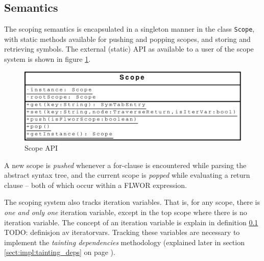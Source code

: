 \subsection{Semantics}
The scoping semantics is encapsulated in a singleton manner in the class
\texttt{Scope}, with static methods available for pushing and popping scopes,
and storing and retrieving symbols. The external (static) API as available to a
user of the scope system is shown in figure \ref{fig:impl:scope_uml}.

\begin{figure}[!htp]
\begin{center}
  \includegraphics[scale=0.5]{diagrams/scope_uml}
  \caption{Scope API}
  \label{fig:impl:scope_uml}
\end{center}
\end{figure}

A new scope is \textit{pushed} whenever a for-clause is encountered while
parsing the abstract syntax tree, and the current scope is \textit{popped} while
evaluating a return clause -- both of which occur within a FLWOR expression.

The scoping system also tracks iteration variables. That is, for any scope,
there is \textit{one and only one} iteration variable, except in the top scope
where there is no iteration variable. The concept of an iteration variable is
explain in definition \ref{} TODO: definisjon av iteratorvars. Tracking these
variables are necessary to implement the \textit{tainting dependencies} methodology (explained
later in section \ref{sect:impl:tainting_deps} on page
\pageref{sect:impl:tainting_deps}).
